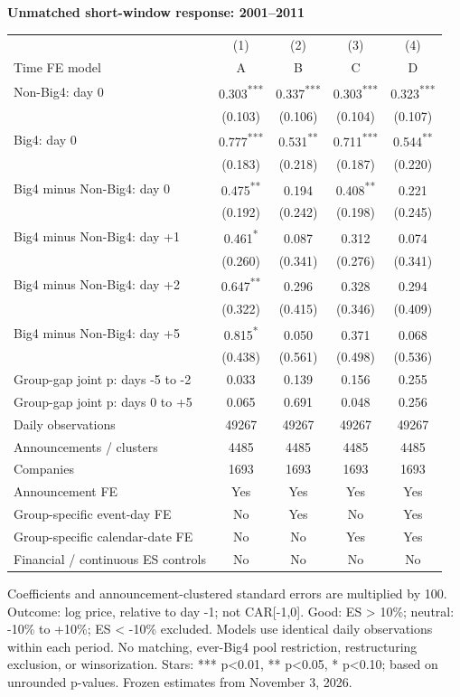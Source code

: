 \documentclass[10pt]{article}
\newcommand{\sym}[1]{\textsuperscript{#1}}\pagestyle{empty}
\begin{document}
\noindent\textbf{Unmatched short-window response: 2001--2011}\par\medskip
\setlength{\tabcolsep}{3pt}\renewcommand{\arraystretch}{1.1}
\noindent\begin{tabular*}{\textwidth}{@{\extracolsep{\fill}}lcccc@{}}\toprule
 & (1) & (2) & (3) & (4) \\
Time FE model & A & B & C & D \\\midrule
Non-Big4: day 0 & 0.303\sym{***} & 0.337\sym{***} & 0.303\sym{***} & 0.323\sym{***} \\
 & (0.103) & (0.106) & (0.104) & (0.107) \\
Big4: day 0 & 0.777\sym{***} & 0.531\sym{**} & 0.711\sym{***} & 0.544\sym{**} \\
 & (0.183) & (0.218) & (0.187) & (0.220) \\
Big4 minus Non-Big4: day 0 & 0.475\sym{**} & 0.194\sym{} & 0.408\sym{**} & 0.221\sym{} \\
 & (0.192) & (0.242) & (0.198) & (0.245) \\
Big4 minus Non-Big4: day +1 & 0.461\sym{*} & 0.087\sym{} & 0.312\sym{} & 0.074\sym{} \\
 & (0.260) & (0.341) & (0.276) & (0.341) \\
Big4 minus Non-Big4: day +2 & 0.647\sym{**} & 0.296\sym{} & 0.328\sym{} & 0.294\sym{} \\
 & (0.322) & (0.415) & (0.346) & (0.409) \\
Big4 minus Non-Big4: day +5 & 0.815\sym{*} & 0.050\sym{} & 0.371\sym{} & 0.068\sym{} \\
 & (0.438) & (0.561) & (0.498) & (0.536) \\
Group-gap joint p: days -5 to -2 & 0.033 & 0.139 & 0.156 & 0.255 \\
Group-gap joint p: days 0 to +5 & 0.065 & 0.691 & 0.048 & 0.256 \\
Daily observations & 49267 & 49267 & 49267 & 49267 \\
Announcements / clusters & 4485 & 4485 & 4485 & 4485 \\
Companies & 1693 & 1693 & 1693 & 1693 \\
Announcement FE & Yes & Yes & Yes & Yes \\
Group-specific event-day FE & No & Yes & No & Yes \\
Group-specific calendar-date FE & No & No & Yes & Yes \\
Financial / continuous ES controls & No & No & No & No \\
\bottomrule\end{tabular*}\par\medskip
\noindent\footnotesize Coefficients and announcement-clustered standard errors are multiplied by 100. Outcome: log price, relative to day -1; not CAR[-1,0]. Good: ES > 10\%; neutral: -10\% to +10\%; ES < -10\% excluded. Models use identical daily observations within each period. No matching, ever-Big4 pool restriction, restructuring exclusion, or winsorization. Stars: *** p<0.01, ** p<0.05, * p<0.10; based on unrounded p-values. Frozen estimates from November 3, 2026.\end{document}
\end{document}

